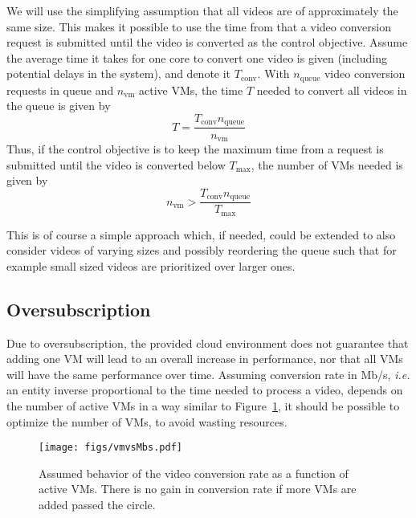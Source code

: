 \documentclass[a4paper, 10pt, english]{article}
\begin{document}
We will use the simplifying assumption that all videos are of approximately the same size. This makes it possible to use the time from that a video conversion request is submitted until the video is converted as the control objective. Assume the average time it takes for one core to convert one video is given (including potential delays in the system), and denote it $ T_{\text{conv}} $. With $ n_{\text{queue}} $ video conversion requests in queue and $ n_{\text{vm}} $ active VMs, the time $ T $ needed to convert all videos in the queue is given by
\begin{equation}
T = \frac{T_{\text{conv}}  n_{\text{queue}}}{n_{\text{vm}}}
\end{equation}
Thus, if the control objective is to keep the maximum time from a request is submitted until the video is converted below $ T_{\text{max}} $, the number of VMs needed is given by
\begin{equation}
n_{\text{vm}} > \frac{T_{\text{conv}}  n_{\text{queue}}}{T_{\text{max}}}
\end{equation}

This is of course a simple approach which, if needed, could be extended to also consider videos of varying sizes and possibly reordering the queue such that for example small sized videos are prioritized over larger ones.

\subsection{Oversubscription}
Due to oversubscription, the provided cloud environment does not guarantee that adding one VM will lead to an overall increase in performance, nor that all VMs will have the same performance over time. Assuming conversion rate in Mb/s, \emph{i.e.} an entity inverse proportional to the time needed to process a video, depends on the number of active VMs in a way similar to Figure~\ref{fig:vmvsMbs}, it should be possible to optimize the number of VMs, to avoid wasting resources.
\begin{figure}
	\label{fig:vmvsMbs}
	\centering
	\texttt{[image: figs/vmvsMbs.pdf]}
	\caption{Assumed behavior of the video conversion rate as a function of active VMs. There is no gain in conversion rate if more VMs are added passed the circle.}
\end{figure}
\end{document}
